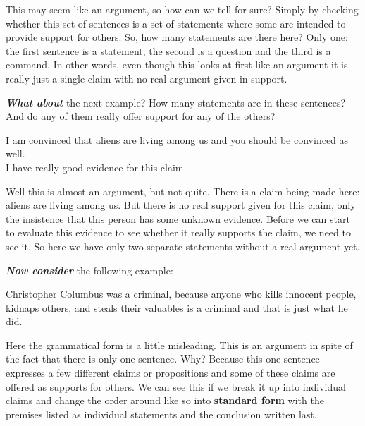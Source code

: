 \documentclass[
  12pt, openany]{book}
\begin{document}
This may seem like an argument, so how can we tell for sure? Simply by checking whether this set of sentences is a set of statements where some are intended to provide support for others. So, how many statements are there here? Only one: the first sentence is a statement, the second is a question and the third is a command. In other words, even though this looks at first like an argument it is really just a single claim with no real argument given in support.

\textbf{\emph{What about}} the next example? How many statements are in these sentences? And do any of them really offer support for any of the others?

\begin{center}

\begin{argument}

I am convinced that aliens are living among us and you should be convinced as well.\\
I have really good evidence for this claim.

\end{argument}

\end{center}

Well this is almost an argument, but not quite. There is a claim being made here: aliens are living among us. But there is no real support given for this claim, only the insistence that this person has some unknown evidence. Before we can start to evaluate this evidence to see whether it really supports the claim, we need to see it. So here we have only two separate statements without a real argument yet.

\textbf{\emph{Now consider}} the following example:

\begin{center}

\begin{argument}

Christopher Columbus was a criminal, because anyone who kills innocent people, kidnaps others, and steals their valuables is a criminal and that is just what he did.

\end{argument}

\end{center}

Here the grammatical form is a little misleading. This is an argument in spite of the fact that there is only one sentence. Why? Because this one sentence expresses a few different claims or propositions and some of these claims are offered as supports for others. We can see this if we break it up into individual claims and change the order around like so into \textbf{standard form} with the premises listed as individual statements and the conclusion written last.
\end{document}
